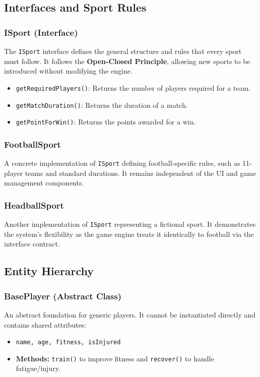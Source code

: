 \documentclass[12pt]{article}
\begin{document}
\subsection{Interfaces and Sport Rules}
\subsubsection{ISport (Interface)}
The \texttt{ISport} interface defines the general structure and rules that every sport must follow. It follows the \textbf{Open-Closed Principle}, allowing new sports to be introduced without modifying the engine.
\begin{itemize}
    \item \texttt{getRequiredPlayers()}: Returns the number of players required for a team.
    \item \texttt{getMatchDuration()}: Returns the duration of a match.
    \item \texttt{getPointForWin()}: Returns the points awarded for a win.
\end{itemize}

\subsubsection{FootballSport}
A concrete implementation of \texttt{ISport} defining football-specific rules, such as 11-player teams and standard durations. It remains independent of the UI and game management components.

\subsubsection{HeadballSport}
Another implementation of \texttt{ISport} representing a fictional sport. It demonstrates the system's flexibility as the game engine treats it identically to football via the interface contract.

\subsection{Entity Hierarchy}
\subsubsection{BasePlayer (Abstract Class)}
An abstract foundation for generic players. It cannot be instantiated directly and contains shared attributes:
\begin{itemize}
    \item \texttt{name, age, fitness, isInjured}
    \item \textbf{Methods:} \texttt{train()} to improve fitness and \texttt{recover()} to handle fatigue/injury.
\end{itemize}
\end{document}
